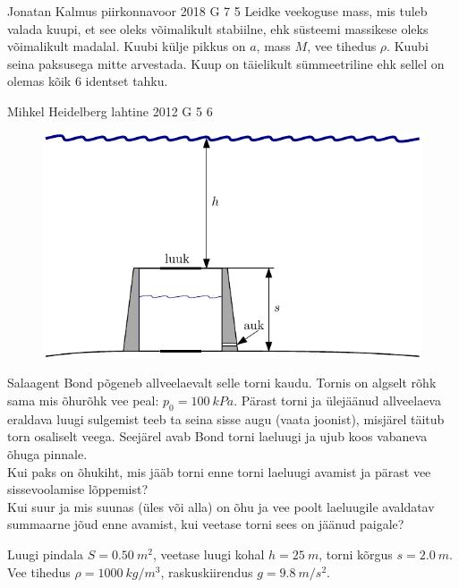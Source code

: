 \documentclass[11pt]{article}
\begin{document}
{%
{Jonatan Kalmus} %
{piirkonnavoor} %
{2018} %
{G 7} %
{5} %
{
\ifStatement
Leidke veekoguse mass, mis tuleb valada kuupi, et see oleks võimalikult stabiilne, ehk süsteemi massikese oleks võimalikult madalal. Kuubi külje pikkus on $a$, mass $M$, vee tihedus $\rho$. Kuubi seina paksusega mitte arvestada. Kuup on täielikult sümmeetriline ehk sellel on olemas kõik 6 identset tahku.
\fi
}

{Mihkel Heidelberg} %
{lahtine} %
{2012} %
{G 5} %
{6} %
{
\ifStatement
\begin{figure}%
\includegraphics[width=\linewidth]{2012-lahg-05-allveelaev_g}%
\end{figure}
Salaagent Bond põgeneb allveelaevalt selle torni kaudu. Tornis on algselt
rõhk sama mis õhurõhk vee peal: $p_0 = \SI{100}{kPa}$. Pärast torni ja ülejäänud
allveelaeva eraldava luugi sulgemist teeb ta seina sisse augu (vaata joonist), misjärel
täitub torn osaliselt veega. Seejärel avab Bond torni laeluugi ja ujub
koos vabaneva õhuga pinnale.\\
\osa Kui paks on õhukiht, mis jääb torni enne torni
laeluugi avamist ja pärast vee sissevoolamise lõppemist?\\
\osa Kui suur ja mis suunas (üles või alla) on õhu ja vee poolt laeluugile avaldatav summaarne jõud enne
avamist, kui veetase torni sees on jäänud paigale?
\par
Luugi pindala $S =
\SI{0,50}{m^2}$, veetase luugi kohal $h=\SI{25}{m}$, torni kõrgus 
$s=\SI{2,0}{m}$. Vee tihedus $\rho = \SI{1000}{kg/m^3}$, raskuskiirendus $g =
\SI{9,8}{m/s^2}$.
\fi
}

}
\end{document}
